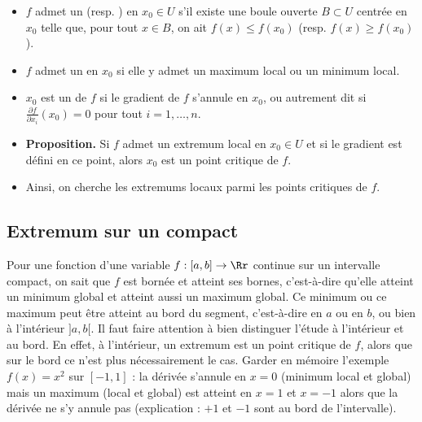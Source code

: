 \begin{itemize}
    \item $f$ admet un  (resp. ) en $x_0 \in U$ s'il existe une boule ouverte $B\subset U$ centrée en $x_0$ telle que, 
    pour tout $x \in B$, on ait $f(x) \le f(x_0)$ (resp. $f(x) \ge f(x_0)$).
        
    \item $f$ admet un  en $x_0$ si elle y admet un maximum local ou un minimum local.
    
    \item $x_0$ est un  de $f$ si le gradient de $f$ s'annule en $x_0$, ou autrement dit si $\frac{\partial f}{\partial x_i}(x_0) = 0$ pour tout $i=1,\ldots,n$. 
      
    \item  \textbf{Proposition.} Si $f$ admet un extremum local en $x_0 \in U$ et si le gradient est défini en ce point, alors $x_0$ est un point critique de $f$.

    \item Ainsi, on cherche les extremums locaux parmi les points critiques de $f$.
\end{itemize}


    
    
\subsection{Extremum sur un compact}

Pour une fonction  d'une variable $f : [a,b] \to \Rr$ continue sur un intervalle compact, on sait que $f$ est bornée et atteint ses bornes, c'est-à-dire qu'elle atteint un minimum global et atteint aussi un maximum global.  Ce minimum ou ce maximum peut être atteint au \og{}bord\fg{} du segment, c'est-à-dire en $a$ ou en $b$, ou bien à \og{}l'intérieur\fg{} $]a,b[$. 
Il faut faire attention à bien distinguer l'étude à l'intérieur et au bord. En effet, à l'intérieur, un extremum est un point critique de $f$, alors que sur le bord ce n'est plus nécessairement le cas. Garder en mémoire l'exemple $f(x) = x^2$ sur $[-1,1]$ : la dérivée s'annule en $x=0$ (minimum local et global) mais un maximum (local et global) est atteint en $x=1$ et $x=-1$ alors que la dérivée ne s'y annule pas (explication : $+1$ et $-1$ sont au bord de l'intervalle).





